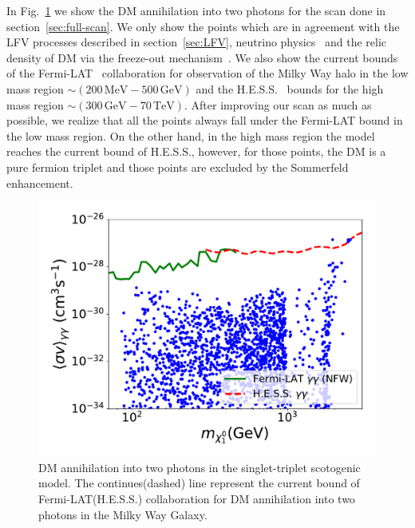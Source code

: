 \documentclass[12pt,letterpaper]{article}
\begin{document}
In Fig.~\ref{fig:sigmavgg} we show the DM annihilation into two photons for the scan done in section~\ref{sec:full-scan}. We only show the points which are in agreement with the LFV processes described in section~\ref{sec:LFV}, neutrino physics~\cite{deSalas:2017kay} and the relic density of DM via the freeze-out mechanism~\cite{Aghanim:2018eyx}.
We also show the current bounds of the Fermi-LAT~\cite{Ackermann:2015lka} collaboration for observation of the Milky Way halo in the low mass region $\sim (200\,\text{MeV}-500\,\text{GeV})$ and the H.E.S.S.~\cite{Abdallah:2018qtu} bounds for the high mass region $\sim (300\,\text{GeV}-70\,\text{TeV})$.
After improving our scan as much as possible, we realize that all the points always fall under the Fermi-LAT bound in the low mass region. On the other hand, in the high mass region the model reaches the current bound of H.E.S.S., however, for those points, the DM is a pure fermion triplet and those points are excluded by the Sommerfeld enhancement.
 
%
\begin{figure}
\begin{center}
\includegraphics[scale=0.5]{sigmavgg_with_neutrino_physics}
\caption{DM annihilation into two photons in the singlet-triplet scotogenic model. The continues(dashed) line represent the current bound of Fermi-LAT(H.E.S.S.) collaboration for DM annihilation into two photons in the Milky Way Galaxy.}
\label{fig:sigmavgg}
\end{center}
\end{figure}
%
 
 
\end{document}
